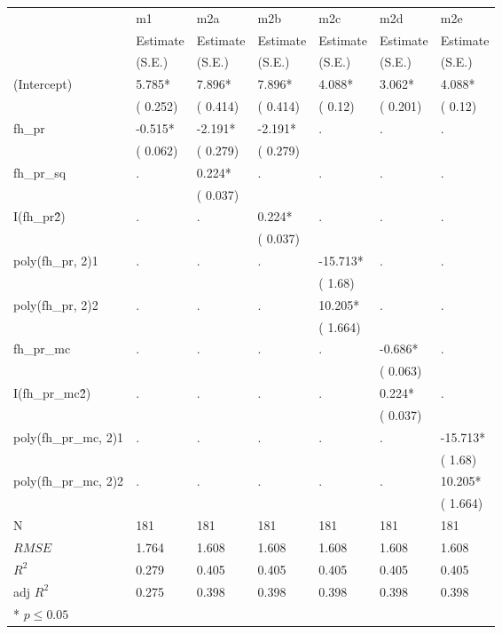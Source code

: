 \begin{center}
 \begin{tabular}{*{7}{l}}
 \hline
      & m1& m2a& m2b& m2c& m2d& m2e \\
               & Estimate  & Estimate  & Estimate  & Estimate  & Estimate  & Estimate  \\
              & (S.E.)  & (S.E.)  & (S.E.)  & (S.E.)  & (S.E.)  & (S.E.)  \\
\hline 
 \hline
  (Intercept)   &    5.785*   &    7.896*   &    7.896*   &    4.088*   &    3.062*   &    4.088* \\
    &   ( 0.252)   &   ( 0.414)   &   ( 0.414)   &   ( 0.12)   &   ( 0.201)   &   ( 0.12) \\
  fh\_pr   &    -0.515*   &    -2.191*   &    -2.191*   & .    & .    & .  \\
    &   ( 0.062)   &   ( 0.279)   &   ( 0.279)   &     &     &   \\
  fh\_pr\_sq   & .    &    0.224*   & .    & .    & .    & .  \\
    &     &   ( 0.037)   &     &     &     &   \\
  I(fh\_pr\^2)   & .    & .    &    0.224*   & .    & .    & .  \\
    &     &     &   ( 0.037)   &     &     &   \\
  poly(fh\_pr, 2)1   & .    & .    & .    &    -15.713*   & .    & .  \\
    &     &     &     &   ( 1.68)   &     &   \\
  poly(fh\_pr, 2)2   & .    & .    & .    &    10.205*   & .    & .  \\
    &     &     &     &   ( 1.664)   &     &   \\
  fh\_pr\_mc   & .    & .    & .    & .    &    -0.686*   & .  \\
    &     &     &     &     &   ( 0.063)   &   \\
  I(fh\_pr\_mc\^2)   & .    & .    & .    & .    &    0.224*   & .  \\
    &     &     &     &     &   ( 0.037)   &   \\
  poly(fh\_pr\_mc, 2)1   & .    & .    & .    & .    & .    &    -15.713* \\
    &     &     &     &     &     &   ( 1.68) \\
  poly(fh\_pr\_mc, 2)2   & .    & .    & .    & .    & .    &    10.205* \\
    &     &     &     &     &     &   ( 1.664) \\
 \hline 
N   &    181   &    181   &    181   &    181   &    181   &    181 \\
 $RMSE$       & 1.764       & 1.608       & 1.608       & 1.608       & 1.608       & 1.608  \\
 $R^2$       & 0.279       & 0.405       & 0.405       & 0.405       & 0.405       & 0.405  \\
 adj $R^2$       & 0.275       & 0.398       & 0.398       & 0.398       & 0.398       & 0.398  \\
 \hline\hline
* $p \le 0.05$\end{tabular}
\end{center}